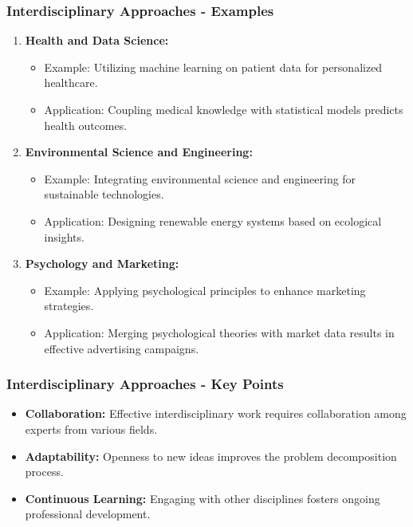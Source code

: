 \documentclass[aspectratio=169]{beamer}
\begin{document}
\begin{frame}[fragile]
    \frametitle{Interdisciplinary Approaches - Examples}
    \begin{enumerate}
        \item \textbf{Health and Data Science:}
            \begin{itemize}
                \item Example: Utilizing machine learning on patient data for personalized healthcare.
                \item Application: Coupling medical knowledge with statistical models predicts health outcomes.
            \end{itemize}
        \item \textbf{Environmental Science and Engineering:}
            \begin{itemize}
                \item Example: Integrating environmental science and engineering for sustainable technologies.
                \item Application: Designing renewable energy systems based on ecological insights.
            \end{itemize}
        \item \textbf{Psychology and Marketing:}
            \begin{itemize}
                \item Example: Applying psychological principles to enhance marketing strategies.
                \item Application: Merging psychological theories with market data results in effective advertising campaigns.
            \end{itemize}
    \end{enumerate}
\end{frame}

\begin{frame}[fragile]
    \frametitle{Interdisciplinary Approaches - Key Points}
    \begin{itemize}
        \item \textbf{Collaboration:} Effective interdisciplinary work requires collaboration among experts from various fields.
        \item \textbf{Adaptability:} Openness to new ideas improves the problem decomposition process.
        \item \textbf{Continuous Learning:} Engaging with other disciplines fosters ongoing professional development.
    \end{itemize}
\end{frame}
\end{document}
